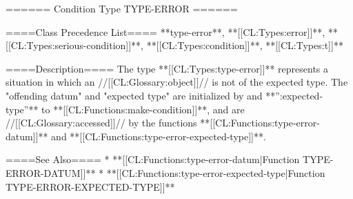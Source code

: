 ====== Condition Type TYPE-ERROR ======

====Class Precedence List==== 
**type-error**, **[[CL:Types:error]]**, **[[CL:Types:serious-condition]]**, **[[CL:Types:condition]]**, **[[CL:Types:t]]**

====Description====
The type **[[CL:Types:type-error]]** represents a situation in which an //[[CL:Glossary:object]]// is not of the expected type. The "offending datum" and "expected type" are initialized by  and **'':expected-type''** to **[[CL:Functions:make-condition]]**, and are //[[CL:Glossary:accessed]]// by the functions **[[CL:Functions:type-error-datum]]** and **[[CL:Functions:type-error-expected-type]]**.

====See Also====
  * **[[CL:Functions:type-error-datum|Function TYPE-ERROR-DATUM]]**
  * **[[CL:Functions:type-error-expected-type|Function TYPE-ERROR-EXPECTED-TYPE]]**

